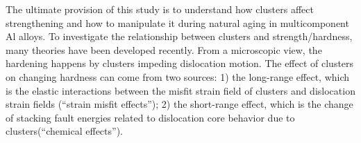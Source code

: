 

The ultimate provision of this study is to understand how clusters affect strengthening and how to manipulate it during natural aging in multicomponent Al alloys. To investigate the relationship between clusters and strength/hardness, many theories have been developed recently\cite{yasi2010first, starink2009thermodynamics, curtin2006predictive}. From a microscopic view, the hardening happens by clusters impeding dislocation motion. The effect of clusters on changing hardness can come from two sources: 1) the long-range effect, which is the elastic interactions between the misfit strain field of clusters and dislocation strain fields (``strain misfit effects''); 2) the short-range effect, which is the change of stacking fault energies related to dislocation core behavior due to clusters(``chemical effects'')\cite{yasi2010first}.




